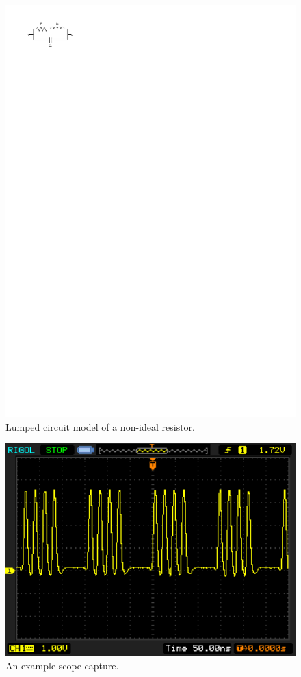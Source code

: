 \documentclass[conference]{IEEEtran}
\begin{document}
\begin{figure}[t] 
	\centering
	\includegraphics[width=0.8\columnwidth]{./img/resistor_equivalent_circuit}
	\caption{Lumped circuit model of a non-ideal resistor.}
	\label{fig:resistor_equivalent_circuit}
\end{figure}

\begin{figure}[t] 
	\centering
	\includegraphics[width=1.0\textwidth]{./img/ClockGen}
	\caption{An example scope capture.}
	\label{fig:ClockGen}
\end{figure}
\end{document}

